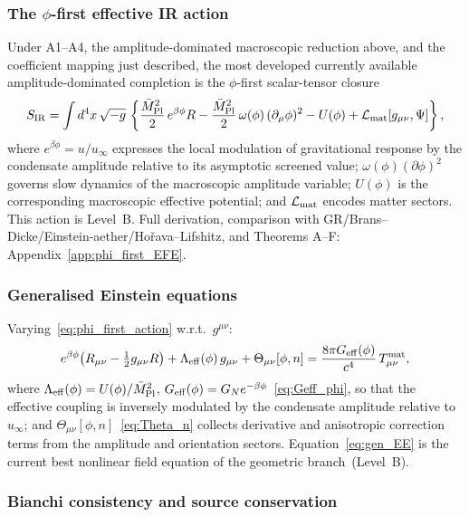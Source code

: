 \documentclass[11pt,a4paper]{article}
\numberwithin{equation}{section}
\begin{document}
\subsubsection*{The $\phi$-first effective IR action}

Under A1--A4, the amplitude-dominated macroscopic reduction above, and
the coefficient mapping just described, the most developed currently
available amplitude-dominated completion is the $\phi$-first
scalar-tensor closure
\begin{equation}
  \label{eq:phi_first_action}
  S_{\rm IR}
  = \int d^4x\,\sqrt{-g}\,
  \left\{
    \frac{\bar M_{\rm Pl}^2}{2}\,e^{\beta\phi} R
    - \frac{\bar M_{\rm Pl}^2}{2}\,\omega(\phi)\,(\partial_\mu\phi)^2
    - U(\phi)
    + \mathcal{L}_{\rm mat}[g_{\mu\nu},\Psi]
  \right\},
\end{equation}
where $e^{\beta\phi}=u/u_\infty$ expresses the local modulation of
gravitational response by the condensate amplitude relative to its
asymptotic screened value; $\omega(\phi)(\partial\phi)^2$ governs slow dynamics of the
macroscopic amplitude variable; $U(\phi)$ is the corresponding
macroscopic effective potential; and $\mathcal{L}_{\rm mat}$ encodes
matter sectors.
This action is Level~B.
Full derivation, comparison with GR/Brans--Dicke/Einstein-aether/Ho\v{r}ava--Lifshitz,
and Theorems A--F: Appendix~\ref{app:phi_first_EFE}.

\subsubsection*{Generalised Einstein equations}

Varying~\eqref{eq:phi_first_action} w.r.t.\ $g^{\mu\nu}$:
\begin{equation}
  \label{eq:gen_EE}
  e^{\beta\phi}\!\left(R_{\mu\nu}-\tfrac{1}{2}g_{\mu\nu}R\right)
  + \Lambda_{\rm eff}(\phi)\,g_{\mu\nu}
  + \Theta_{\mu\nu}[\phi,n]
  = \frac{8\pi G_{\rm eff}(\phi)}{c^4}\,T_{\mu\nu}^{\rm mat},
\end{equation}
where $\Lambda_{\rm eff}(\phi)=U(\phi)/\bar M_{\rm Pl}^2$,
$G_{\rm eff}(\phi)=G_N e^{-\beta\phi}$~\eqref{eq:Geff_phi},
so that the effective coupling is inversely modulated by the condensate
amplitude relative to $u_\infty$; and
$\Theta_{\mu\nu}[\phi,n]$~\eqref{eq:Theta_n} collects derivative and
anisotropic correction terms from the amplitude and orientation sectors.
Equation~\eqref{eq:gen_EE} is the current best nonlinear field equation
of the geometric branch~(Level~B).

\subsubsection*{Bianchi consistency and source conservation}
\end{document}
